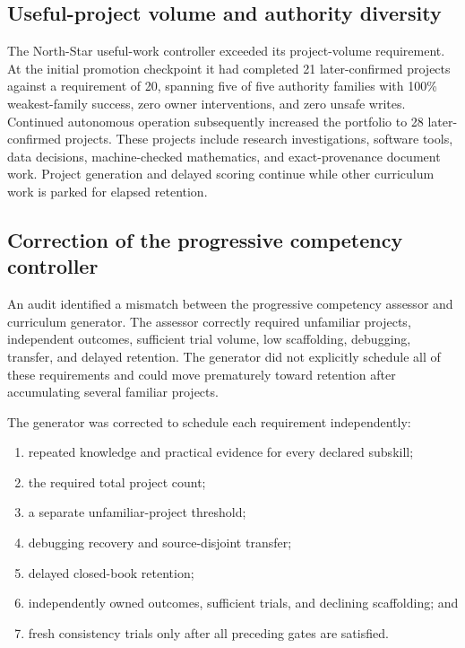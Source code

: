 \subsection{Useful-project volume and authority diversity}

The North-Star useful-work controller exceeded its project-volume requirement.
At the initial promotion checkpoint it had completed 21 later-confirmed projects
against a requirement of 20, spanning five of five authority families with
100\% weakest-family success, zero owner interventions, and zero unsafe writes.
Continued autonomous operation subsequently increased the portfolio to 28
later-confirmed projects.  These projects include research investigations,
software tools, data decisions, machine-checked mathematics, and exact-provenance
document work.  Project generation and delayed scoring continue while other
curriculum work is parked for elapsed retention.

\subsection{Correction of the progressive competency controller}

An audit identified a mismatch between the progressive competency assessor and
curriculum generator.  The assessor correctly required unfamiliar projects,
independent outcomes, sufficient trial volume, low scaffolding, debugging,
transfer, and delayed retention.  The generator did not explicitly schedule all
of these requirements and could move prematurely toward retention after
accumulating several familiar projects.

The generator was corrected to schedule each requirement independently:
\begin{enumerate}
    \item repeated knowledge and practical evidence for every declared subskill;
    \item the required total project count;
    \item a separate unfamiliar-project threshold;
    \item debugging recovery and source-disjoint transfer;
    \item delayed closed-book retention;
    \item independently owned outcomes, sufficient trials, and declining
          scaffolding; and
    \item fresh consistency trials only after all preceding gates are satisfied.
\end{enumerate}

